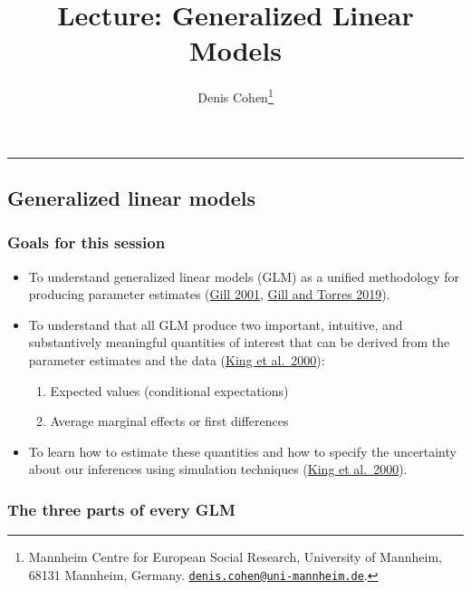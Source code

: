 \documentclass[
  11pt,
]{article}
\title{Lecture: Generalized Linear Models}
\author{Denis Cohen\footnote{Mannheim Centre for European Social Research, University of Mannheim, 68131 Mannheim, Germany. \href{mailto:denis.cohen@uni-mannheim.de}{\nolinkurl{denis.cohen@uni-mannheim.de}}.}}
\date{}
\providecommand{\tightlist}{%
  \setlength{\itemsep}{0pt}\setlength{\parskip}{0pt}}
\begin{document}
\maketitle

\begin{center}\rule{0.5\linewidth}{0.5pt}\end{center}

\hypertarget{generalized-linear-models}{%
\subsection{Generalized linear models}\label{generalized-linear-models}}

\hypertarget{goals-for-this-session}{%
\subsubsection{Goals for this session}\label{goals-for-this-session}}

\begin{itemize}
\tightlist
\item
  To understand generalized linear models (GLM) as a unified methodology for producing parameter estimates (\href{https://www.researchgate.net/publication/235726158_Generalized_Linear_Models_A_Unified_Approach}{Gill 2001}, \href{https://us.sagepub.com/en-us/nam/generalized-linear-models/book257965}{Gill and Torres 2019}).
\item
  To understand that all GLM produce two important, intuitive, and substantively meaningful quantities of interest that can be derived from the parameter estimates and the data (\href{https://gking.harvard.edu/files/gking/files/making.pdf}{King et al.~2000}):

  \begin{enumerate}
  \def\labelenumi{\arabic{enumi}.}
  \tightlist
  \item
    Expected values (conditional expectations)
  \item
    Average marginal effects or first differences
  \end{enumerate}
\item
  To learn how to estimate these quantities and how to specify the uncertainty about our inferences using simulation techniques (\href{https://gking.harvard.edu/files/gking/files/making.pdf}{King et al.~2000}).
\end{itemize}

\hypertarget{the-three-parts-of-every-glm}{%
\subsubsection{The three parts of every GLM}\label{the-three-parts-of-every-glm}}
\end{document}
